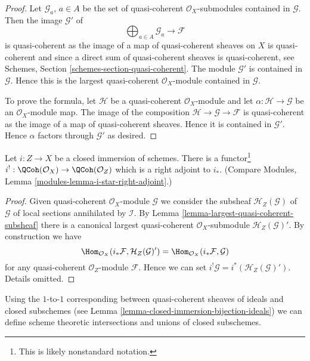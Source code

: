 \begin{proof}
Let $\mathcal{G}_a$, $a \in A$ be the set of quasi-coherent
$\mathcal{O}_X$-submodules contained in $\mathcal{G}$.
Then the image $\mathcal{G}'$ of
$$
\bigoplus\nolimits_{a \in A} \mathcal{G}_a \longrightarrow \mathcal{F}
$$
is quasi-coherent as the image of a map of quasi-coherent sheaves
on $X$ is quasi-coherent and since a direct sum of quasi-coherent sheaves
is quasi-coherent, see
Schemes, Section \ref{schemes-section-quasi-coherent}.
The module $\mathcal{G}'$ is contained in $\mathcal{G}$. Hence this is the
largest quasi-coherent $\mathcal{O}_X$-module contained in $\mathcal{G}$.

\medskip\noindent
To prove the formula, let $\mathcal{H}$ be a quasi-coherent
$\mathcal{O}_X$-module and let $\alpha : \mathcal{H} \to \mathcal{G}$
be an $\mathcal{O}_X$-module map. The image of the composition
$\mathcal{H} \to \mathcal{G} \to \mathcal{F}$ is quasi-coherent
as the image of a map of quasi-coherent sheaves. Hence it is contained
in $\mathcal{G}'$. Hence $\alpha$ factors through $\mathcal{G}'$
as desired.
\end{proof}

\begin{lemma}
\label{lemma-i-upper-shriek}
Let $i : Z \to X$ be a closed immersion of schemes.
There is a functor\footnote{This is likely nonstandard notation.}
$i^! : \QCoh(\mathcal{O}_X) \to \QCoh(\mathcal{O}_Z)$
which is a right adjoint to $i_*$. (Compare
Modules, Lemma \ref{modules-lemma-i-star-right-adjoint}.)
\end{lemma}

\begin{proof}
Given quasi-coherent $\mathcal{O}_X$-module $\mathcal{G}$ we consider
the subsheaf $\mathcal{H}_Z(\mathcal{G})$ of $\mathcal{G}$ of local sections
annihilated by $\mathcal{I}$. By
Lemma \ref{lemma-largest-quasi-coherent-subsheaf}
there is a canonical largest quasi-coherent $\mathcal{O}_X$-submodule
$\mathcal{H}_Z(\mathcal{G})'$. By construction we have
$$
\Hom_{\mathcal{O}_X}(i_*\mathcal{F}, \mathcal{H}_Z(\mathcal{G})')
=
\Hom_{\mathcal{O}_X}(i_*\mathcal{F}, \mathcal{G})
$$
for any quasi-coherent $\mathcal{O}_Z$-module $\mathcal{F}$.
Hence we can set $i^!\mathcal{G} = i^*(\mathcal{H}_Z(\mathcal{G})')$.
Details omitted.
\end{proof}

\noindent
Using the $1$-to-$1$ corresponding between quasi-coherent sheaves
of ideals and closed subschemes (see
Lemma \ref{lemma-closed-immersion-bijection-ideals})
we can define scheme theoretic intersections and unions
of closed subschemes.

